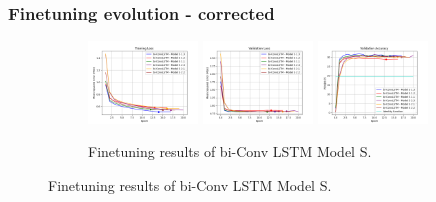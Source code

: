 \documentclass{beamer}
\begin{document}
\begin{frame}
    \frametitle{Finetuning evolution - corrected}
    \begin{figure}[htbp]
        \centering    
        \begin{subfigure}[b]{\textwidth}
            \centering
            \includegraphics[width=0.32\textwidth]{./entities/finetuned_new/unipose/train_losses.png}
            \includegraphics[width=0.32\textwidth]{./entities/finetuned_new/unipose/val_losses.png}
            \includegraphics[width=0.32\textwidth]{./entities/finetuned_new/unipose/val_accs.png}
            \caption{Finetuning results of bi-Conv LSTM Model S.}
        \end{subfigure}
        \hfill
    

\end{figure}
\end{frame}
\end{document}

